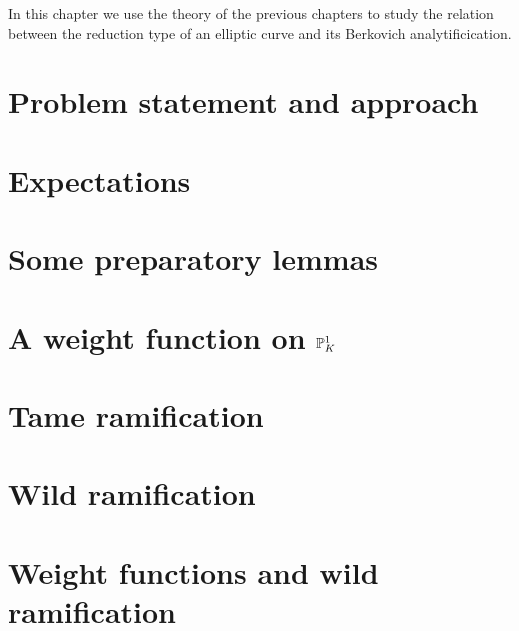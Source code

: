 In this chapter we use the theory of the previous chapters to study the relation between the reduction type of an elliptic curve and its Berkovich analytificication.  

\section{Problem statement and approach} \label{sec:problem_statement}


\section{Expectations} \label{sec:expectations}




\section{Some preparatory lemmas} \label{sec:some_preparatory_lemmas}


\section{ A weight function on $\mathbb{P}^{1}_K$} \label{sec:a_weight_function_on_pro_1_k}


\section{Tame ramification} \label{sec:if_mk}


\section{Wild ramification} \label{sec:wild_ramification}


\section{Weight functions and wild ramification} \label{sec:weight_functions_and_wild_ramification}



